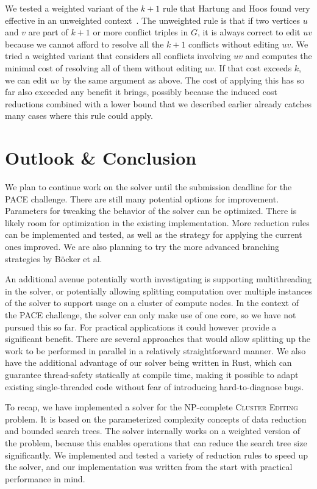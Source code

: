 \documentclass[12pt,oneside,english,parskip=full,headings=small]{scrbook}
\theoremstyle{definition}
\begin{document}
We tested a weighted variant of the $k+1$ rule that Hartung and Hoos found very effective in an
unweighted context~\cite{HartungHoos}. The unweighted rule is that if two vertices $u$ and $v$ are
part of $k + 1$ or more conflict triples in $G$, it is always correct to edit $uv$ because we cannot
afford to resolve all the $k + 1$ conflicts without editing $uv$. We tried a weighted variant that
considers all conflicts involving $uv$ and computes the minimal cost of resolving all of them
without editing $uv$. If that cost exceeds $k$, we can edit $uv$ by the same argument as above. The
cost of applying this has so far also exceeded any benefit it brings, possibly because the induced
cost reductions combined with a lower bound that we described earlier already catches many cases
where this rule could apply.

\chapter{Outlook \& Conclusion}

We plan to continue work on the solver until the submission deadline for the PACE challenge. There
are still many potential options for improvement. Parameters for tweaking the behavior of the
solver can be optimized. There is likely room for optimization in the existing implementation. More
reduction rules can be implemented and tested, as well as the strategy for applying the current ones
improved. We are also planning to try the more advanced branching strategies by Böcker et
al.~\cite{GoldenRatio}

An additional avenue potentially worth investigating is supporting multithreading in the solver, or
potentially allowing splitting computation over multiple instances of the solver to support usage on
a cluster of compute nodes. In the context of the PACE challenge, the solver can only make use of
one core, so we have not pursued this so far. For practical applications it could however provide a
significant benefit. There are several approaches that would allow splitting up the work to be
performed in parallel in a relatively straightforward manner. We also have the additional advantage
of our solver being written in Rust, which can guarantee thread-safety statically at compile time,
making it possible to adapt existing single-threaded code without fear of introducing
hard-to-diagnose bugs.

To recap, we have implemented a solver for the NP-complete \textsc{Cluster Editing} problem. It is
based on the parameterized complexity concepts of data reduction and bounded search trees. The
solver internally works on a weighted version of the problem, because this enables operations that
can reduce the search tree size significantly. We implemented and tested a variety of reduction
rules to speed up the solver, and our implementation was written from the start with practical
performance in mind.
\end{document}

